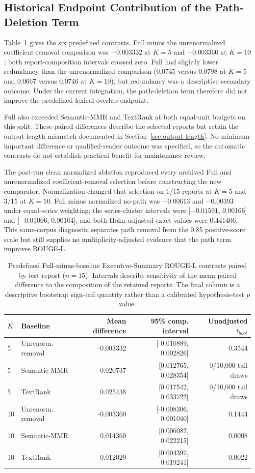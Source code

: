 \documentclass[information,article,submit,moreauthors]{Definitions/mdpi}
\begin{document}
\subsection{Historical Endpoint Contribution of the Path-Deletion Term}

Table~\ref{tab:contrasts} gives the six predefined contrasts. Full minus the unrenormalized coefficient-removal comparison was $-0.003332$ at $K=5$ and $-0.003360$ at $K=10$; both report-composition intervals crossed zero. Full had slightly lower redundancy than the unrenormalized comparison (0.0745 versus 0.0798 at $K=5$ and 0.0667 versus 0.0746 at $K=10$), but redundancy was a descriptive secondary outcome. Under the current integration, the path-deletion term therefore did not improve the predefined lexical-overlap endpoint.

Full also exceeded Semantic-MMR and TextRank at both equal-unit budgets on this split. These paired differences describe the selected reports but retain the output-length mismatch documented in Section~\ref{sec:output-length}. No minimum important difference or qualified-reader outcome was specified, so the automatic contrasts do not establish practical benefit for maintenance review.

The post-run clean normalized ablation reproduced every archived Full and unrenormalized coefficient-removal selection before constructing the new comparator. Normalization changed that selection on 1/15 reports at $K=5$ and 3/15 at $K=10$. Full minus normalized no-path was $-0.00613$ and $-0.00393$ under equal-series weighting; the series-cluster intervals were [$-0.01591$, 0.00166] and [$-0.01006$, 0.00104], and both Holm-adjusted exact values were 0.441406. This same-corpus diagnostic separates path removal from the 0.85 positive-score scale but still supplies no multiplicity-adjusted evidence that the path term improves ROUGE-L.

\begin{table}[H]
\caption{Predefined Full-minus-baseline Executive-Summary ROUGE-L contrasts paired by test report ($n=15$). Intervals describe sensitivity of the mean paired difference to the composition of the retained reports. The final column is a descriptive bootstrap sign-tail quantity rather than a calibrated hypothesis-test $p$ value.}
\label{tab:contrasts}\centering\small
\begin{tabular}{llrrr}
\toprule
$K$ & Baseline & Mean difference & 95\% comp. interval & Unadjusted $t_{boot}$\\
\midrule
5 & Unrenorm. removal & -0.003332 & [-0.010889, 0.002826] & 0.3544\\
5 & Semantic-MMR & 0.020737 & [0.012765, 0.028354] & 0/10,000 tail draws\\
5 & TextRank & 0.025438 & [0.017542, 0.033722] & 0/10,000 tail draws\\
10 & Unrenorm. removal & -0.003360 & [-0.008306, 0.001040] & 0.1444\\
10 & Semantic-MMR & 0.014360 & [0.006082, 0.022215] & 0.0008\\
10 & TextRank & 0.012029 & [0.004397, 0.019241] & 0.0022\\
\bottomrule
\end{tabular}
\end{table}
\end{document}
